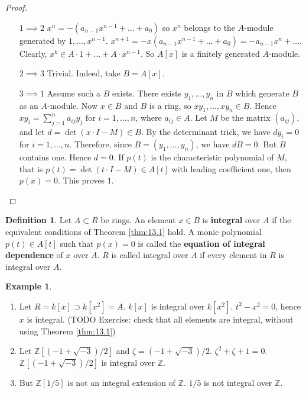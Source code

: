 \documentclass{article}
\newcommand{\Z}{\mathbb{Z}}
\newcommand{\rb}[1]{\left( #1 \right)}
\renewcommand{\sb}[1]{\left[ #1 \right]}
\theoremstyle{definition}\newtheorem{definition}{Definition}[section]
\theoremstyle{definition}\newtheorem{remark}[definition]{Remark}
\theoremstyle{definition}\newtheorem*{example}{Example}
\theoremstyle{definition}\newtheorem*{note}{Note}
\begin{document}
\begin{proof}
\hfill
\begin{itemize}[leftmargin=0.5in]
\item[$ 1 \implies 2 $] $ x^n = -\rb{a_{n - 1}x^{n - 1} + \dots + a_0} $ so $ x^n $ belongs to the $ A $-module generated by $ 1, \dots, x^{n - 1} $. $ x^{n + 1} = -x\rb{a_{n - 1}x^{n - 1} + \dots + a_0} = -a_{n - 1}x^n + \dots $. Clearly, $ x^k \in A \cdot 1 + \dots + A \cdot x^{n - 1} $. So $ A\sb{x} $ is a finitely generated $ A $-module.
\item[$ 2 \implies 3 $] Trivial. Indeed, take $ B = A\sb{x} $.
\item[$ 3 \implies 1 $] Assume such a $ B $ exists. There exists $ y_1, \dots, y_n $ in $ B $ which generate $ B $ as an $ A $-module. Now $ x \in B $ and $ B $ is a ring, so $ xy_1, \dots, xy_n \in B $. Hence $ xy_i = \sum_{j = 1}^n a_{ij}y_j $ for $ i = 1, \dots, n $, where $ a_{ij} \in A $. Let $ M $ be the matrix $ \rb{a_{ij}} $, and let $ d = \det\rb{x \cdot I - M} \in B $. By the determinant trick, we have $ dy_i = 0 $ for $ i = 1, \dots, n $. Therefore, since $ B = \rb{y_1, \dots, y_n} $, we have $ dB = 0 $. But $ B $ contains one. Hence $ d = 0 $. If $ p\rb{t} $ is the characteristic polynomial of $ M $, that is $ p\rb{t} = \det\rb{t \cdot I - M} \in A\sb{t} $ with leading coefficient one, then $ p\rb{x} = 0 $. This proves $ 1 $.
\end{itemize}
\end{proof}

\begin{definition}
Let $ A \subset R $ be rings. An element $ x \in B $ is \textbf{integral} over $ A $ if the equivalent conditions of Theorem \ref{thm:13.1} hold. A monic polynomial $ p\rb{t} \in A\sb{t} $ such that $ p\rb{x} = 0 $ is called the \textbf{equation of integral dependence} of $ x $ over $ A $. $ R $ is called integral over $ A $ if every element in $ R $ is integral over $ A $.
\end{definition}

\begin{example}
\hfill
\begin{enumerate}
\item Let $ R = k\sb{x} \supset k\sb{x^2} = A $. $ k\sb{x} $ is integral over $ k\sb{x^2} $. $ t^2 - x^2 = 0 $, hence $ x $ is integral. (TODO Exercise: check that all elements are integral, without using Theorem \ref{thm:13.1})
\item Let $ \Z\sb{\rb{-1 + \sqrt{-3}} / 2} $ and $ \zeta = \rb{-1 + \sqrt{-3}} / 2 $. $ \zeta^2 + \zeta + 1 = 0 $. $ \Z\sb{\rb{-1 + \sqrt{-3}} / 2} $ is integral over $ \Z $.
\item But $ \Z\sb{1 / 5} $ is not an integral extension of $ \Z $. $ 1 / 5 $ is not integral over $ \Z $.
\end{enumerate}
\end{example}
\end{document}

